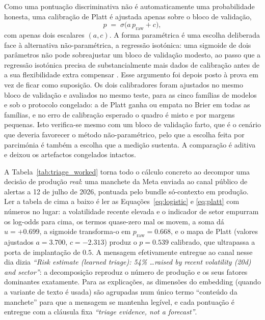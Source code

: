 Como uma pontuação discriminativa não é automaticamente uma probabilidade honesta, uma
calibração de Platt é ajustada apenas sobre o bloco de validação,
\begin{equation}
p \;=\; \sigma\!\big(a\,p_{\text{raw}} + c\big),
\label{eq:platt}
\end{equation}
com apenas dois escalares $(a, c)$. A forma paramétrica é uma escolha deliberada face à alternativa
não-paramétrica, a regressão isotónica: uma sigmoide de dois parâmetros não pode sobreajustar um bloco de
validação modesto, ao passo que a regressão isotónica precisa de substancialmente mais dados de calibração
antes de a sua flexibilidade extra compensar \autocite{niculescu2005calibration}. Esse argumento foi
depois posto à prova em vez de ficar como suposição. Os dois calibradores foram ajustados no mesmo bloco
de validação e avaliados no mesmo teste, para as cinco famílias de modelos e sob o protocolo congelado:
a de Platt ganha ou empata no Brier em todas as famílias, e no erro de calibração esperado o quadro é
misto e por margens pequenas. Isto verifica-se mesmo com um bloco de validação farto, que é o cenário
que deveria favorecer o método não-paramétrico, pelo que a escolha feita por parcimónia é também a
escolha que a medição sustenta. A comparação é aditiva e deixou os artefactos congelados intactos.

A Tabela~\ref{tab:triage_worked} torna todo o cálculo concreto ao decompor uma decisão de produção
\emph{real}: uma manchete da Meta enviada ao canal público de alertas a 12 de julho de 2026, pontuada pelo
bundle só-contexto em produção. Ler a tabela de cima a baixo é ler as Equações~\eqref{eq:logistic} e
\eqref{eq:platt} com números no lugar: a volatilidade recente elevada e o indicador de setor empurram os
log-odds para cima, os termos quase-zero mal os movem, a soma dá $u = +0.699$, a sigmoide transforma-o em
$p_{\text{raw}} = 0.668$, e o mapa de Platt (valores ajustados $a = 3.700$, $c = -2.313$) produz o $p =
0.539$ calibrado, que ultrapassa a porta de implantação de $0.5$. A mensagem efetivamente entregue ao canal
nesse dia dizia \emph{``Risk estimate (learned triage): 54\% \dots raised by recent volatility (20d) and
sector''}: a decomposição reproduz o número de produção e os seus fatores dominantes exatamente. Para as
explicações, as dimensões do embedding (quando a variante de texto é usada) são agrupadas num único termo
``conteúdo da manchete'' para que a mensagem se mantenha legível, e cada pontuação é entregue com a cláusula
fixa \emph{``triage evidence, not a forecast''}.

